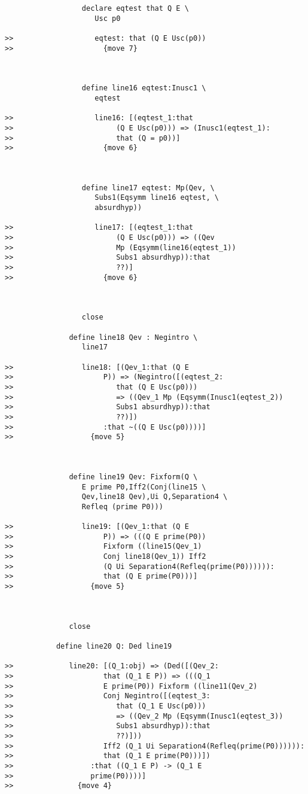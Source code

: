\documentclass[12pt]{article}
\begin{document}
\begin{verbatim}
                  declare eqtest that Q E \
                     Usc p0

>>                   eqtest: that (Q E Usc(p0))
>>                     {move 7}



                  define line16 eqtest:Inusc1 \
                     eqtest

>>                   line16: [(eqtest_1:that
>>                        (Q E Usc(p0))) => (Inusc1(eqtest_1):
>>                        that (Q = p0))]
>>                     {move 6}



                  define line17 eqtest: Mp(Qev, \
                     Subs1(Eqsymm line16 eqtest, \
                     absurdhyp))

>>                   line17: [(eqtest_1:that
>>                        (Q E Usc(p0))) => ((Qev
>>                        Mp (Eqsymm(line16(eqtest_1))
>>                        Subs1 absurdhyp)):that
>>                        ??)]
>>                     {move 6}



                  close

               define line18 Qev : Negintro \
                  line17

>>                line18: [(Qev_1:that (Q E
>>                     P)) => (Negintro([(eqtest_2:
>>                        that (Q E Usc(p0)))
>>                        => ((Qev_1 Mp (Eqsymm(Inusc1(eqtest_2))
>>                        Subs1 absurdhyp)):that
>>                        ??)])
>>                     :that ~((Q E Usc(p0))))]
>>                  {move 5}



               define line19 Qev: Fixform(Q \
                  E prime P0,Iff2(Conj(line15 \
                  Qev,line18 Qev),Ui Q,Separation4 \
                  Refleq (prime P0)))

>>                line19: [(Qev_1:that (Q E
>>                     P)) => (((Q E prime(P0))
>>                     Fixform ((line15(Qev_1)
>>                     Conj line18(Qev_1)) Iff2
>>                     (Q Ui Separation4(Refleq(prime(P0)))))):
>>                     that (Q E prime(P0)))]
>>                  {move 5}



               close

            define line20 Q: Ded line19

>>             line20: [(Q_1:obj) => (Ded([(Qev_2:
>>                     that (Q_1 E P)) => (((Q_1
>>                     E prime(P0)) Fixform ((line11(Qev_2)
>>                     Conj Negintro([(eqtest_3:
>>                        that (Q_1 E Usc(p0)))
>>                        => ((Qev_2 Mp (Eqsymm(Inusc1(eqtest_3))
>>                        Subs1 absurdhyp)):that
>>                        ??)]))
>>                     Iff2 (Q_1 Ui Separation4(Refleq(prime(P0)))))):
>>                     that (Q_1 E prime(P0)))])
>>                  :that ((Q_1 E P) -> (Q_1 E
>>                  prime(P0))))]
>>               {move 4}




\end{verbatim}
\end{document}
